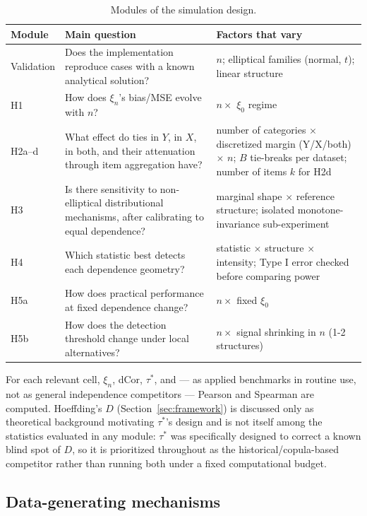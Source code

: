 \documentclass[article]{ajs}
\begin{document}
\begin{table}[H]
\caption{\label{tab:modules}Modules of the simulation design.}
\begin{center}
\small
\begin{tabular}{p{1.6cm}p{4.6cm}p{5.3cm}}
\toprule
Module & Main question & Factors that vary \\
\midrule
Validation & Does the implementation reproduce cases with a known analytical solution? & $n$; elliptical families (normal, $t$); linear structure \\[4pt]
H1 & How does $\xi_n$'s bias/MSE evolve with $n$? & $n \times$ $\xi_0$ regime \\[4pt]
H2a--d & What effect do ties in $Y$, in $X$, in both, and their attenuation through item aggregation have? & number of categories $\times$ discretized margin (Y/X/both) $\times$ $n$; $B$ tie-breaks per dataset; number of items $k$ for H2d \\[4pt]
H3 & Is there sensitivity to non-elliptical distributional mechanisms, after calibrating to equal dependence? & marginal shape $\times$ reference structure; isolated monotone-invariance sub-experiment \\[4pt]
H4 & Which statistic best detects each dependence geometry? & statistic $\times$ structure $\times$ intensity; Type I error checked before comparing power \\[4pt]
H5a & How does practical performance at fixed dependence change? & $n \times$ fixed $\xi_0$ \\[4pt]
H5b & How does the detection threshold change under local alternatives? & $n \times$ signal shrinking in $n$ (1-2 structures) \\
\bottomrule
\end{tabular}
\end{center}
\end{table}

For each relevant cell, $\xi_n$, dCor, $\tau^\ast$, and --- as applied
benchmarks in routine use, not as general independence competitors ---
Pearson and Spearman are computed. Hoeffding's $D$ (Section~\ref{sec:framework})
is discussed only as theoretical background motivating $\tau^\ast$'s
design and is not itself among the statistics evaluated in any module:
$\tau^\ast$ was specifically designed to correct a known blind spot of
$D$, so it is prioritized throughout as the historical/copula-based
competitor rather than running both under a fixed computational
budget.

\subsection{Data-generating mechanisms}
\end{document}
